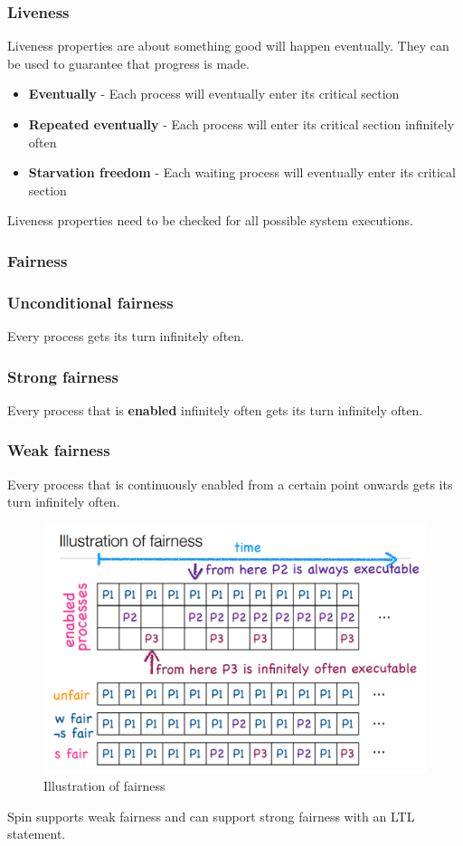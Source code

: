 \documentclass[11pt]{article}
\theoremstyle{definition}
\begin{document}
\subsubsection{Liveness}
Liveness properties are about something good will happen eventually. They can be used to guarantee that progress is made.
\begin{itemize}
\item \textbf{Eventually} - Each process will eventually enter its critical section
\item \textbf{Repeated eventually} - Each process will enter its critical section infinitely often
\item \textbf{Starvation freedom} - Each waiting process will eventually enter its critical section
\end{itemize}
Liveness properties need to be checked for all possible system executions.

\subsubsection{Fairness}
\subsubsection*{Unconditional fairness}
Every process gets its turn infinitely often.

\subsubsection*{Strong fairness}
Every process that is \textbf{enabled} infinitely often gets its turn infinitely often.

\subsubsection*{Weak fairness}
Every process that is continuously enabled from a certain point onwards gets its turn infinitely often.

\begin{figure}[H]
\centering
\includegraphics[width=1\textwidth, keepaspectratio]{imgs/fairness-example.png}
\caption{Illustration of fairness}
\end{figure}
\noindent
Spin supports weak fairness and can support strong fairness with an LTL statement.
\end{document}
